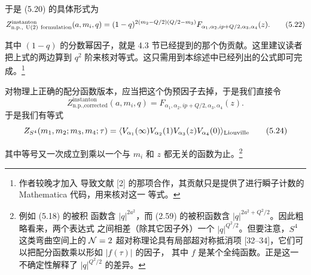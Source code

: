 于是 (5.20) 的具体形式为
\begin{equation}
Z^{\text{instanton}}_{\text{n.p.},\ \U(2)\ \text{formulation}}(a,m_i,q)
=(1-q)^{2(m_2-Q/2)(Q/2-m_3)}F_{\alpha_1,\alpha_2,ip+Q/2,\alpha_3,\alpha_4}(z).
\tag{5.22}
\end{equation}

其中 $(1-q)$ 的分数幂因子，就是 4.3 节已经提到的那个伪贡献。这里建议读者把上式的两边算到
$q^2$ 阶来核对等式。这只需用到本综述中已经列出的公式即可完成。\footnote{作者较晚才加入
导致文献 [2] 的那项合作，其贡献只是提供了进行瞬子计数的 Mathematica 代码，用来核对这一
等式。}

对物理上正确的配分函数版本，应当把这个伪预因子去掉，于是我们直接令
\begin{equation}
Z^{\text{instanton}}_{\text{n.p.},\text{corrected}}(a,m_i,q)
=F_{\alpha_1,\alpha_2,ip+Q/2,\alpha_3,\alpha_4}(z).
\tag{5.23}
\end{equation}
于是我们有等式
\begin{equation}
Z_{S^4}(m_1,m_2;m_3,m_4;\tau)=\langle V_{\alpha_1}(\infty)V_{\alpha_2}(1)V_{\alpha_3}(z)
V_{\alpha_4}(0)\rangle_{\mathrm{Liouville}}
\tag{5.24}
\end{equation}


其中等号又一次成立到乘以一个与 $m_i$ 和 $z$ 都无关的函数为止。\footnote{例如 (5.18) 的被积
函数含 $|q|^{2a^2}$，而 (2.59) 的被积函数含 $|q|^{2a^2+Q^2/2}$。因此粗略看来，两个表达式
之间相差（除其它因子外）一个 $|q|^{Q^2/2}$。但要注意，$S^4$ 这类弯曲空间上的 $\mathcal{N}=2$
超对称理论具有局部超对称抵消项 [32--34]，它们可以把配分函数乘以形如 $|f(\tau)|$ 的因子，
其中 $f$ 是某个全纯函数。正是这一不确定性解释了 $|q|^{Q^2/2}$ 的差异。}



